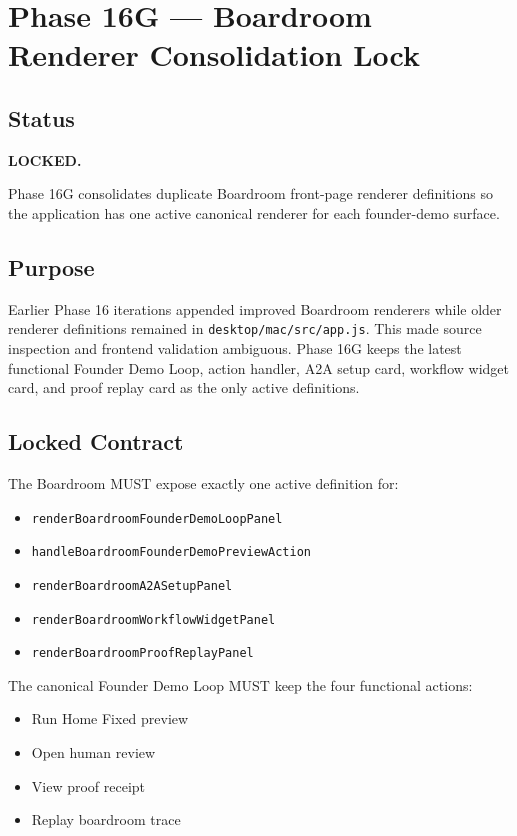 \section{Phase 16G --- Boardroom Renderer Consolidation Lock}
\label{sec:aion-phase16g-boardroom-renderer-consolidation-lock}

\subsection{Status}
\textbf{LOCKED.}

Phase 16G consolidates duplicate Boardroom front-page renderer definitions so the application has one active canonical renderer for each founder-demo surface.

\subsection{Purpose}
Earlier Phase 16 iterations appended improved Boardroom renderers while older renderer definitions remained in \texttt{desktop/mac/src/app.js}. This made source inspection and frontend validation ambiguous. Phase 16G keeps the latest functional Founder Demo Loop, action handler, A2A setup card, workflow widget card, and proof replay card as the only active definitions.

\subsection{Locked Contract}
The Boardroom MUST expose exactly one active definition for:
\begin{itemize}
  \item \texttt{renderBoardroomFounderDemoLoopPanel}
  \item \texttt{handleBoardroomFounderDemoPreviewAction}
  \item \texttt{renderBoardroomA2ASetupPanel}
  \item \texttt{renderBoardroomWorkflowWidgetPanel}
  \item \texttt{renderBoardroomProofReplayPanel}
\end{itemize}

The canonical Founder Demo Loop MUST keep the four functional actions:
\begin{itemize}
  \item Run Home Fixed preview
  \item Open human review
  \item View proof receipt
  \item Replay boardroom trace
\end{itemize}


